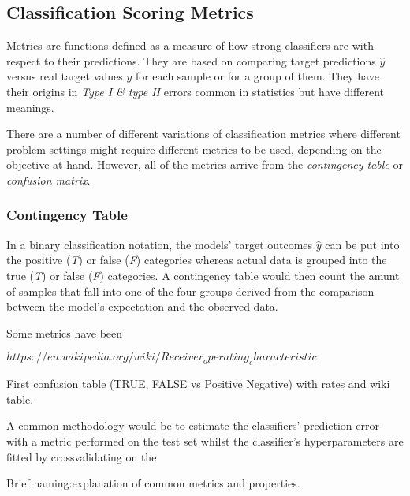 \subsection{Classification Scoring Metrics}

Metrics are functions defined as a measure of how strong classifiers are with respect to their predictions. They are based on comparing target predictions $\hat{y}$ versus real target values $y$ for each sample or for a group of them. They have their origins in \textit{Type I \& type II} errors common in statistics but have different meanings. 

There are a number of different variations of classification metrics where different problem settings might require different metrics to be used, depending on the objective at hand. However, all of the metrics arrive from the \textit{contingency table} or \textit{confusion matrix}.

\subsubsection{Contingency Table}

In a binary classification notation, the models' target outcomes $\hat{y}$ can be put into the positive (\textit{T}) or false (\textit{F}) categories whereas actual data is grouped into the true (\textit{T}) or false (\textit{F}) categories. A contingency table would then count the amunt of samples that fall into one of the four groups derived from the comparison between the model's expectation and the observed data. 


Some metrics have been 

$https://en.wikipedia.org/wiki/Receiver_operating_characteristic$

First confusion table (TRUE, FALSE vs Positive Negative) with rates and wiki table.

A common methodology would be to estimate the classifiers' prediction error with a metric performed on the test set whilst the classifier's hyperparameters are fitted by crossvalidating on the 

Brief naming:explanation of common metrics and properties.

